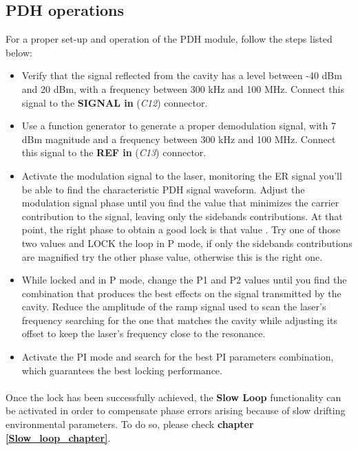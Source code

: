 \subsection{PDH operations} \label{PDH_operations_chapter}
For a proper set-up and operation of the PDH module, follow the steps listed below:
\begin{itemize}
    \item Verify that the signal reflected from the cavity has a level between -40 dBm and 20 dBm, with a frequency between 300 kHz and 100 MHz.
    \newline Connect this signal to the \textbf{SIGNAL in} (\textit{C12}) connector.
    
    \item Use a function generator to generate a proper demodulation signal, with 7 dBm magnitude and a frequency between 300 kHz and 100 MHz.
    \newline Connect this signal to the \textbf{REF in} (\textit{C13}) connector.
    
    \item Activate the modulation signal to the laser, monitoring the ER signal you’ll be able to find the characteristic PDH signal waveform. Adjust the modulation signal phase until you find the value that minimizes the carrier contribution to the signal, leaving only the sidebands contributions. At that point, the right phase to obtain a good lock is that value \degree. Try one of those two values and LOCK the loop in P mode, if only the sidebands contributions are magnified try the other phase value, otherwise this is the right one.
    
    \item While locked and in P mode, change the P1 and P2 values until you find the combination that produces the best effects on the signal transmitted by the cavity. Reduce the amplitude of the ramp signal used to scan the laser’s frequency searching for the one that matches the cavity while adjusting its offset to keep the laser’s frequency close to the resonance.
    
    \item Activate the PI mode and search for the best PI parameters combination, which guarantees the best locking performance.
\end{itemize}


\paragraph{} Once the lock has been successfully achieved, the \textbf{Slow Loop} functionality can be activated in order to compensate phase errors arising because of slow drifting environmental parameters. To do so, please check \textbf{chapter \ref{Slow_loop_chapter}}.

